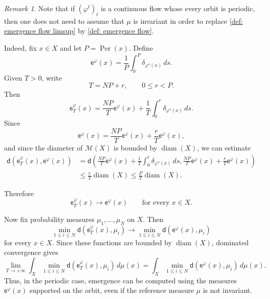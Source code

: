 \documentclass[11pt,reqno]{amsart}
\theoremstyle{plain}
\theoremstyle{definition}
\theoremstyle{remark}
\newtheorem{rmk}[theorem]{Remark}
\theoremstyle{plain}
\numberwithin{equation}{section}
\newcommand{\Per}{\operatorname{Per}}
\newcommand{\diam}{\operatorname{diam}}
\begin{document}
\begin{rmk}\label{rmk:periodic-flow-empirical-convergence}
Note that if $(\varphi^{t})_{t}$ is a continuous flow whose every orbit is
periodic, then one does not need to assume that $\mu$ is invariant in order to
replace \eqref{def: emergence flow limsup} by \eqref{def: emergence flow}.

Indeed, fix $x\in X$ and let $P=\Per(x)$. Define
\begin{equation*}
\mathsf e^\varphi(x)
=\frac{1}{P}\int_0^P \delta_{\varphi^s(x)}\,ds.
\end{equation*}
Given $T>0$, write
\begin{equation*}
T=NP+r,
\qquad
0\leq r<P.
\end{equation*}
Then
\begin{equation*}
\mathsf e_T^\varphi(x)
=\frac{NP}{T}\mathsf e^\varphi(x)
+
\frac{1}{T}\int_0^r\delta_{\varphi^s(x)}\,ds.
\end{equation*}
Since
\begin{equation*}
\mathsf e^\varphi(x)
=
\frac{NP}{T}\mathsf e^\varphi(x)
+
\frac{r}{T}\mathsf e^\varphi(x),
\end{equation*}
and since the diameter of $\mathcal{M}(X)$ is bounded by $\diam(X)$,
we can estimate
\begin{align*}
\mathsf d(\mathsf e_T^\varphi(x),\mathsf e^\varphi(x))
&=
\mathsf d\left(
\frac{NP}{T}\mathsf e^\varphi(x)
+
\frac{1}{T}\int_0^r\delta_{\varphi^s(x)}\,ds,
\frac{NP}{T}\mathsf e^\varphi(x)
+
\frac{r}{T}\mathsf e^\varphi(x)
\right) \\
&\leq
\frac{r}{T}\operatorname{diam}(X)
\leq
\frac{P}{T}\operatorname{diam}(X).
\end{align*}

Therefore
\begin{equation*}
\mathsf e_T^\varphi(x)\longrightarrow \mathsf e^\varphi(x)
\qquad\text{for every }x\in X.
\end{equation*}

Now fix probability measures $\mu_1,\dots,\mu_N$ on $X$. Then
\begin{equation*}
\min_{1\leq i\leq N}
\mathsf d(\mathsf e_T^\varphi(x),\mu_i)
\longrightarrow
\min_{1\leq i\leq N}
\mathsf d(\mathsf e^\varphi(x),\mu_i)
\end{equation*}
for every $x\in X$. Since these functions are bounded by
$\operatorname{diam}(X)$, dominated convergence gives
\begin{equation*}
\lim_{T\to+\infty}
\int_X
\min_{1\leq i\leq N}
\mathsf d(\mathsf e_T^\varphi(x),\mu_i)\,d\mu(x)
=\int_X
\min_{1\leq i\leq N}
\mathsf d(\mathsf e^\varphi(x),\mu_i)\,d\mu(x).
\end{equation*}
Thus, in the periodic case, emergence can be computed using the measures $\mathsf e^\varphi(x)$ supported on the orbit, even if the reference measure $\mu$ is not
invariant.
\end{rmk}
\end{document}
